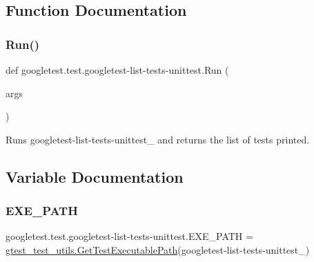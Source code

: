 \subsection{Function Documentation}
\mbox{\label{namespacegoogletest_1_1test_1_1googletest-list-tests-unittest_ad23aeb6dad35d4c52695bf4d7c8ae18a}} 
\subsubsection{\texorpdfstring{Run()}{Run()}}
{\footnotesize\ttfamily def googletest.\+test.\+googletest-\/list-\/tests-\/unittest.\+Run (\begin{DoxyParamCaption}\item[{}]{args }\end{DoxyParamCaption})}

\begin{DoxyVerb}Runs googletest-list-tests-unittest_ and returns the list of tests printed.\end{DoxyVerb}
 

\subsection{Variable Documentation}
\mbox{\label{namespacegoogletest_1_1test_1_1googletest-list-tests-unittest_a9a0acaf8ecd0209c30404d614b02bc3c}} 
\subsubsection{\texorpdfstring{EXE\_PATH}{EXE\_PATH}}
{\footnotesize\ttfamily googletest.\+test.\+googletest-\/list-\/tests-\/unittest.\+E\+X\+E\+\_\+\+P\+A\+TH = \mbox{\hyperlink{namespacegoogletest_1_1test_1_1gtest__test__utils_ac9af888c702350aac56b154a6af34098}{gtest\+\_\+test\+\_\+utils.\+Get\+Test\+Executable\+Path}}(\textquotesingle{}googletest-\/list-\/tests-\/unittest\+\_\+\textquotesingle{})}

